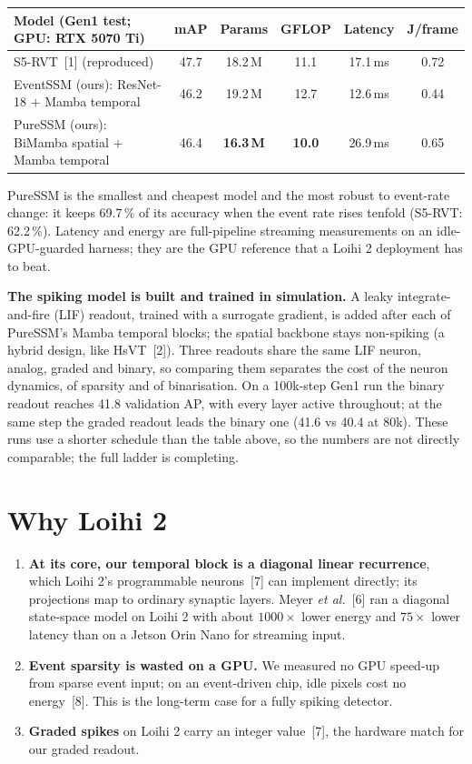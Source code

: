 \documentclass[11pt,a4paper]{article}
\begin{document}
\begin{table}[htbp]
\centering\small
\begin{tabularx}{\textwidth}{@{}Y c c c c c@{}}
\toprule
\textbf{Model (Gen1 test; GPU: RTX 5070 Ti)} & \textbf{mAP} & \textbf{Params} & \textbf{GFLOP} &
\textbf{Latency} & \textbf{J/frame} \\
\midrule
S5-RVT~[1] (reproduced) & 47.7 & 18.2\,M & 11.1 & 17.1\,ms & 0.72 \\
EventSSM (ours): ResNet-18 $+$ Mamba temporal & 46.2 & 19.2\,M & 12.7 & 12.6\,ms & 0.44 \\
PureSSM (ours): BiMamba spatial $+$ Mamba temporal & 46.4 & \textbf{16.3\,M} & \textbf{10.0} & 26.9\,ms & 0.65 \\
\bottomrule
\end{tabularx}
\end{table}
\vspace{-6pt}
PureSSM is the smallest and cheapest model and the most robust to event-rate change: it keeps 69.7\,\% of
its accuracy when the event rate rises tenfold (S5-RVT: 62.2\,\%). Latency and energy are full-pipeline streaming
measurements on an idle-GPU-guarded harness; they are the GPU reference that a
Loihi 2 deployment has to beat.

\textbf{The spiking model is built and trained in simulation.} A leaky integrate-and-fire (LIF) readout, trained
with a surrogate gradient, is added after each of PureSSM's Mamba temporal blocks; the spatial backbone stays
non-spiking (a hybrid design, like HsVT~[2]). Three readouts share the same LIF neuron, analog,
graded and binary, so comparing them separates the cost of the neuron dynamics, of sparsity and of
binarisation. On a 100k-step Gen1 run the binary readout reaches 41.8 validation AP, with every layer active
throughout; at the same step the graded readout leads the binary one (41.6 vs 40.4 at 80k). These runs use a
shorter schedule than the table above, so the numbers are not directly comparable; the full ladder is completing.

\section{Why Loihi 2}
\begin{enumerate}[leftmargin=1.4em, itemsep=2pt, topsep=2pt]
  \item \textbf{At its core, our temporal block is a diagonal linear recurrence}, which Loihi 2's programmable
  neurons~[7] can implement directly; its projections map to ordinary synaptic layers. Meyer \emph{et al.}~[6] ran a diagonal state-space model on Loihi 2 with about
  $1000\times$ lower energy and $75\times$ lower latency than on a Jetson Orin Nano for streaming input.
  \item \textbf{Event sparsity is wasted on a GPU.} We measured no GPU speed-up from sparse event input; on an
  event-driven chip, idle pixels cost no energy~[8]. This is the long-term case for a fully spiking detector.
  \item \textbf{Graded spikes} on Loihi 2 carry an integer value~[7], the hardware match for our graded readout.
\end{enumerate}
\end{document}
